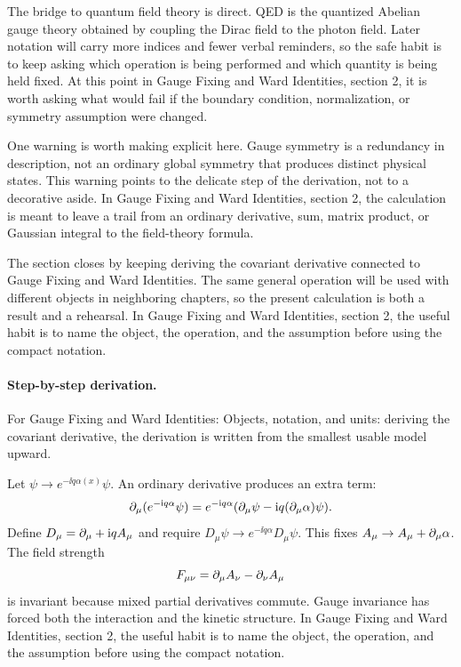 The bridge to quantum field theory is direct.  QED is the quantized Abelian gauge theory obtained by coupling the Dirac field to the photon field.  Later notation will carry more indices and fewer verbal reminders, so the safe habit is to keep asking which operation is being performed and which quantity is being held fixed.  At this point in Gauge Fixing and Ward Identities, section 2, it is worth asking what would fail if the boundary condition, normalization, or symmetry assumption were changed.

One warning is worth making explicit here.  Gauge symmetry is a redundancy in description, not an ordinary global symmetry that produces distinct physical states.  This warning points to the delicate step of the derivation, not to a decorative aside.  In Gauge Fixing and Ward Identities, section 2, the calculation is meant to leave a trail from an ordinary derivative, sum, matrix product, or Gaussian integral to the field-theory formula.

The section closes by keeping deriving the covariant derivative connected to Gauge Fixing and Ward Identities.  The same general operation will be used with different objects in neighboring chapters, so the present calculation is both a result and a rehearsal.  In Gauge Fixing and Ward Identities, section 2, the useful habit is to name the object, the operation, and the assumption before using the compact notation.



\paragraph{Step-by-step derivation.}

For Gauge Fixing and Ward Identities: Objects, notation, and units: deriving the covariant derivative, the derivation is written from the smallest usable model upward.

Let \(\psi\to e^{-\ii q\alpha(x)}\psi\).  An ordinary derivative produces an extra term:
\[
  \partial_\mu(e^{-\mathrm i q\alpha}\psi)
  =
  e^{-\mathrm i q\alpha}(\partial_\mu\psi-\mathrm i q(\partial_\mu\alpha)\psi).
\]
Define \(D_\mu=\partial_\mu+\mathrm i qA_\mu\) and require \(D_\mu\psi\to e^{-\ii q\alpha}D_\mu\psi\).  This fixes \(A_\mu\to A_\mu+\partial_\mu\alpha\).  The field strength
\[
  F_{\mu\nu}=\partial_\mu A_\nu-\partial_\nu A_\mu
\]
is invariant because mixed partial derivatives commute.  Gauge invariance has forced both the interaction and the kinetic structure.  In Gauge Fixing and Ward Identities, section 2, the useful habit is to name the object, the operation, and the assumption before using the compact notation.

